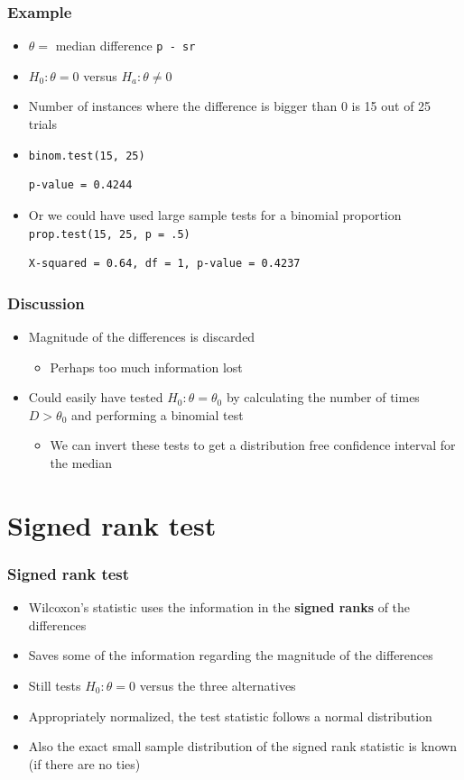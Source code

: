 \documentclass[aspectratio=169]{beamer}
\begin{document}
\begin{frame}[fragile]\frametitle{Example}
\begin{itemize}
\item $\theta =$ median difference \texttt{p - sr}
\item $H_0:\theta = 0$ versus $H_a:\theta \neq 0$
\item Number of instances where the difference is bigger than 0 is
  15 out of 25 trials
\item \texttt{binom.test(15, 25)}
\begin{verbatim}
p-value = 0.4244
\end{verbatim}
\item Or we could have used large sample tests for a binomial
  proportion \texttt{prop.test(15, 25, p = .5)}
\begin{verbatim}
X-squared = 0.64, df = 1, p-value = 0.4237
\end{verbatim}
\end{itemize}
\end{frame}

\begin{frame}\frametitle{Discussion}
\begin{itemize}
\item Magnitude of the differences is discarded
  \begin{itemize}
  \item Perhaps too much information lost
  \end{itemize}
\item Could easily have tested $H_0:\theta = \theta_0$ by calculating the number
  of times $D > \theta_0$ and performing a binomial test
  \begin{itemize}
  \item We can invert these tests to get a distribution free confidence interval
    for the median
  \end{itemize}
\end{itemize}
\end{frame}

\section{Signed rank test}
\begin{frame}\frametitle{Signed rank test}
\begin{itemize}
\item Wilcoxon's statistic uses the information in the {\bf signed ranks}
  of the differences
\item Saves some of the information regarding the magnitude of the differences
\item Still tests $H_0:\theta = 0$ versus the three alternatives
\item Appropriately normalized, the test statistic follows a normal distribution
\item Also the exact small sample distribution of the signed rank statistic is known
  (if there are no ties)
\end{itemize}
\end{frame}
\end{document}
